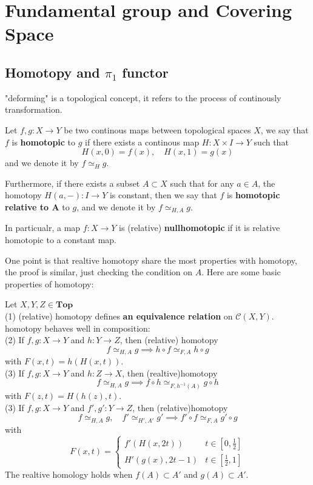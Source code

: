 \section{Fundamental group and Covering Space}
\subsection{Homotopy and \(\pi_1\) functor}

"deforming" is a topological concept, it refers to the process of continously transformation.

\begin{definition}
    Let \(f,g :X \to Y\) be two continous maps between topological spaces \(X\), we say that \(f\) is \textbf{homotopic} to \(g\) if there exists a continous map \(H:X \times I \to Y\) such that
    \[H(x,0) = f(x), \quad H(x,1) = g(x)\]
    and we denote it by \(f \simeq_H g\). 
    
    Furthermore, if there exists a subset \(A \subset X\) such that for any \(a \in A\), the homotopy \(H(a,-): I \to Y\) is constant, then we say that \(f\) is \textbf{homotopic relative to A} to \(g\), and we denote it by \(f \simeq_{H,A} g\).

    In particualr, a map \(f:X \to Y\) is (relative) \textbf{nullhomotopic} if it is relative homotopic to a constant map.
\end{definition}

One point is that realtive homotopy share the most properties with homotopy, the proof is similar, just checking the condition on \(A\). Here are some basic properties of homotopy:

\begin{proposition}
    Let \(X,Y,Z \in \mathbf{Top}\)\\
    (1) (relative) homotopy defines \textbf{an equivalence relation} on \(\mathcal{C}(X,Y)\).\\

    homotopy behaves well in composition:\\
    (2) If \(f,g:X \to Y\) and \(h:Y \to Z\), then (relative) homotopy 
    \[f \simeq_{H,A} g \implies h\circ f \simeq_{F,A} h \circ g\]
    with \(F(x,t) = h(H(x,t))\).\\
    (3) If \(f,g:X \to Y\) and \(h:Z \to X\), then (realtive)homotopy
    \[f \simeq_{H,A} g \implies f \circ h \simeq_{F,h^{-1}(A)} g \circ h\]
    with \(F(z,t) = H(h(z),t)\).\\
    (3) If \(f,g:X \to Y\) and \(f',g':Y \to Z\), then (relative)homotopy
    \[f \simeq_{H,A} g, \quad  f' \simeq_{H',A'} g' \implies f'\circ f \simeq_{F,A} g' \circ g\]
    with \[F(x,t) = \begin{cases}
        f'(H(x,2t)) & t \in [0, \frac{1}{2}] \\
        H'(g(x),2t-1) & t \in [\frac{1}{2}, 1]
    \end{cases}\]   
    The realtive homology holds when \(f(A) \subset A'\) and \(g(A) \subset A'\).
\end{proposition}


